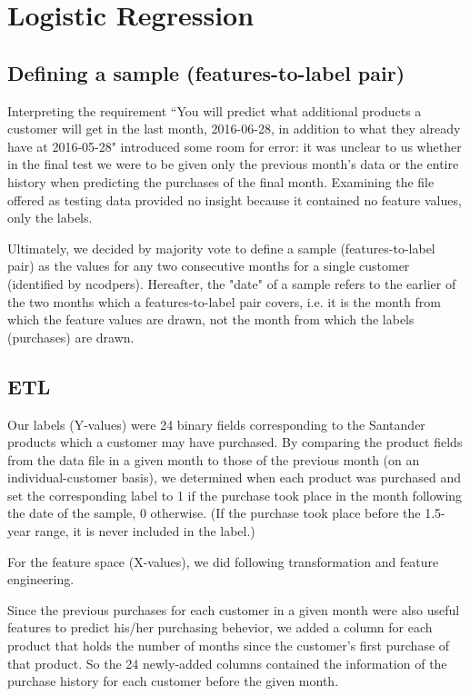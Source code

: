 \documentclass{article}
\begin{document}
\begin{spacing}{1}
\begin{large}
\begin{enumerate}
\end{enumerate}

\section{Logistic Regression}

\subsection{Defining a sample (features-to-label pair)}

Interpreting the requirement ``You will predict what additional products a customer will get in the last month, 2016-06-28, in addition to what they already have at 2016-05-28" introduced some room for error: it was unclear to us whether in the final test we were to be given only the previous month's data or the entire history when predicting the purchases of the final month. Examining the file offered as testing data provided no insight because it contained no feature values, only the labels.

Ultimately, we decided by majority vote to define a sample (features-to-label pair) as the values for any two consecutive months for a single customer (identified by ncodpers). Hereafter, the "date" of a sample refers to the earlier of the two months which a features-to-label pair covers, i.e. it is the month from which the feature values are drawn, not the month from which the labels (purchases) are drawn.

\subsection{ETL}

Our labels (Y-values) were 24 binary fields corresponding to the Santander products which a customer may have purchased. By comparing the product fields from the data file in a given month to those of the previous month (on an individual-customer basis), we determined when each product was purchased and set the corresponding label to 1 if the purchase took place in the month following the date of the sample, 0 otherwise. (If the purchase took place before the 1.5-year range, it is never included in the label.)

For the feature space (X-values), we did following transformation and feature engineering.

Since the previous purchases for each customer in a given month were also useful features to predict his/her purchasing behevior, we added a column for each product that holds the number of months since the customer’s first purchase of that product. So the 24 newly-added columns contained the information of the purchase history for each customer before the given month. 


\end{large}
\end{spacing}
\end{document}
